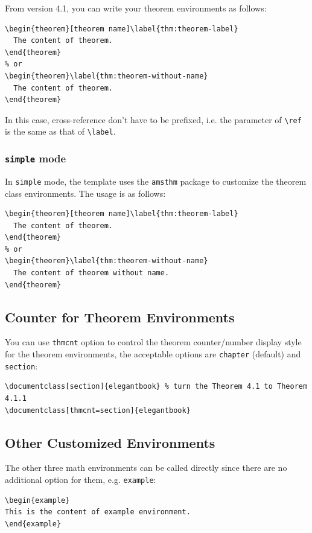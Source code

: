\documentclass[11pt,bibtex]{elegantbook}
\begin{document}
From version 4.1, you can write your theorem environments as follows:
\begin{lstlisting}
\begin{theorem}[theorem name]\label{thm:theorem-label}
  The content of theorem.
\end{theorem}
% or
\begin{theorem}\label{thm:theorem-without-name}
  The content of theorem.
\end{theorem}
\end{lstlisting}

In this case, cross-reference don't have to be prefixed, i.e. the parameter of \lstinline{\ref} is the same as that of \lstinline{\label}.

\subsubsection{\lstinline{simple} mode}

In \lstinline{simple} mode, the template uses the \lstinline{amsthm} package to customize the theorem class environments. The usage is as follows:

\begin{lstlisting}
\begin{theorem}[theorem name]\label{thm:theorem-label}
  The content of theorem.
\end{theorem}
% or
\begin{theorem}\label{thm:theorem-without-name}
  The content of theorem without name.
\end{theorem}
\end{lstlisting}

\subsection{Counter for Theorem Environments}

You can use \lstinline{thmcnt} option to control the theorem counter/number display style for the theorem environments, the acceptable options are \lstinline{chapter} (default) and \lstinline{section}:

\begin{lstlisting}
\documentclass[section]{elegantbook} % turn the Theorem 4.1 to Theorem 4.1.1
\documentclass[thmcnt=section]{elegantbook}
\end{lstlisting}


\subsection{Other Customized Environments}
The other three math environments can be called directly since there are no additional option for them, e.g. \lstinline{example}:
\begin{lstlisting}
\begin{example}
This is the content of example environment.
\end{example}
\end{lstlisting}
\end{document}
